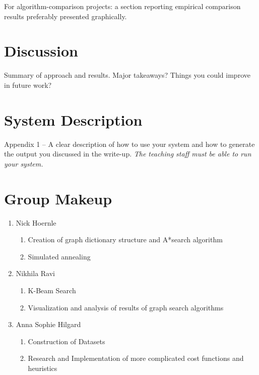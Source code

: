 \documentclass[11pt]{article}
\begin{document}
 For algorithm-comparison projects: a section reporting empirical comparison results preferably presented graphically.


\section{Discussion}

Summary of approach and results. Major takeaways? Things you could improve in future work?

\appendix

\section{System Description}

 Appendix 1 – A clear description of how to use your system and how to generate the output you discussed in the write-up. \emph{The teaching staff must be able to run your system.}

\section{Group Makeup}

\begin{enumerate}
\item Nick Hoernle
\begin{enumerate}
\item Creation of graph dictionary structure and A*search algorithm
\item Simulated annealing
\end{enumerate}
\item Nikhila Ravi
\begin{enumerate}
\item K-Beam Search
\item Visualization and analysis of results of graph search algorithms
\end{enumerate}
\item Anna Sophie Hilgard
\begin{enumerate}
\item Construction of Datasets
\item Research and Implementation of more complicated cost functions and heuristics
\end{enumerate}
\end{enumerate}


 

\end{document}
